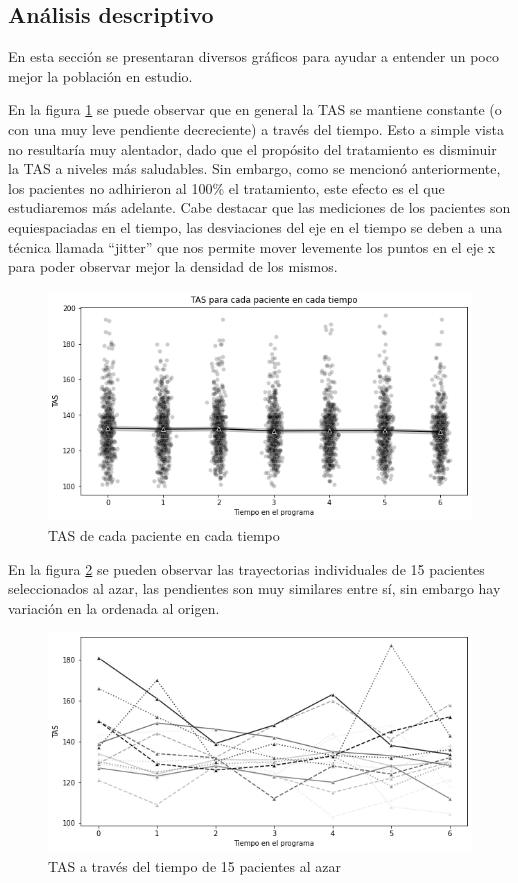 \documentclass[spanish]{article}
\numberwithin{figure}{subsection}
\numberwithin{equation}{subsection}
\numberwithin{table}{subsection}
\begin{document}
\subsection{Análisis descriptivo}

En esta sección se presentaran diversos gráficos para ayudar a entender un poco
mejor la población en estudio.

En la figura \ref{TAS_vs_tpo} se puede observar que en general la TAS se
mantiene constante (o con una muy leve pendiente decreciente) a través del
tiempo. Esto a simple vista no resultaría muy alentador, dado que el propósito
del tratamiento es disminuir la TAS a niveles más saludables. Sin embargo, como
se mencionó anteriormente, los pacientes no adhirieron al 100\% el tratamiento,
este efecto es el que estudiaremos más adelante. Cabe destacar que las
mediciones de los pacientes son equiespaciadas en el tiempo, las desviaciones
del eje en el tiempo se deben a una técnica llamada ``jitter'' que nos permite
mover levemente los puntos en el eje x para poder observar mejor la densidad de
los mismos. 

\begin{figure}[H]
	\centering
	\includegraphics[scale=0.5]{img/TAS_vs_tpo.png}
	\caption{TAS de cada paciente en cada tiempo}
	\label{TAS_vs_tpo}
\end{figure}

En la figura \ref{spaghetti} se pueden observar las trayectorias individuales
de 15 pacientes seleccionados al azar, las pendientes son muy similares entre
sí, sin embargo hay variación en la ordenada al origen.

\begin{figure}[H]
	\centering
	\includegraphics[scale=0.5]{img/spaghetti_plot.png}
	\caption{TAS a través del tiempo de 15 pacientes al azar}
	\label{spaghetti}
\end{figure}
\end{document}
